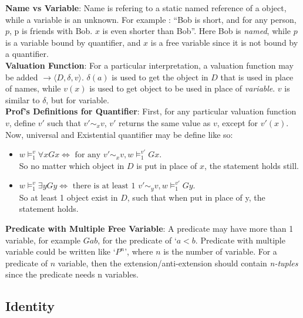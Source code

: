 \documentclass{article}
\begin{document}
{\textbf{Name vs Variable}: Name is refering to a static named reference of a object, while 
a variable is an unknown. For example : ``Bob is short, and for any person, $p$, p is friends with Bob. $x$ is even
shorter than Bob''. Here Bob is \emph{named}, while $p$ is a variable bound by quantifier, and $x$ is a free variable since
it is not bound by a quantifier.\\

\textbf{Valuation Function}: For a particular interpretation, a valuation function may be added $\rightarrow \langle D, \delta, v \rangle$.
$\delta(a)$ is used to get the object in $D$ that is used in place of names, while $v(x)$ is used to 
get object to be used in place of \emph{variable}. $v$ is similar to $\delta$, but for variable.\\

\textbf{Prof's Definitions for Quantifier}: First, for any particular valuation function $v$,
define $v'$ such that $v' \mathtt{\sim}_x v$, $v'$ returns the same value as $v$, except for $v'(x)$. Now, 
universal and Existential quantifier may be define like so:
\begin{itemize}
    \item {$w \models^v_1 \forall x Gx \iff \text{ for any } v' \mathtt{\sim}_x v, w \models^{v'}_1 Gx$.
    \\So no matter which object in $D$ is put in place of $x$, the statement holds still.
    } 
    \item {$w \models^v_1 \exists y Gy \iff \text{ there is at least 1 } v' \mathtt{\sim}_y v, w \models^{v'}_1 Gy$.
    \\So at least 1 object exist in $D$, such that when put in place of y, the statement holds.
    } 
\end{itemize}

\textbf{Predicate with Multiple Free Variable}: A predicate may have more than 1 variable, for example $Gab$, 
for the predicate of `$a < b$. Predicate with multiple variable could be written like `$P^n$', where 
$n$ is the number of variable. For a predicate of $n$ variable, then the extension/anti-extension should contain 
\emph{n-tuples} since the predicate needs n variables.
}

\newpage
\subsection{Identity}
\end{document}
